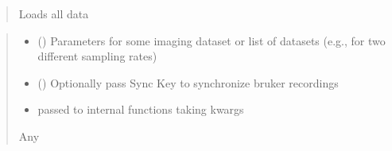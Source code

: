 \documentclass[letterpaper,10pt,english]{sphinxmanual}
\begin{document}
\begin{fulllineitems}
\begin{fulllineitems}
\begin{quote}
\sphinxAtStartPar
Loads all data
\end{quote}
\begin{quote}\begin{description}
\begin{itemize}
\item {} 
\sphinxAtStartPar
{} (\sphinxstyleliteralemphasis{\sphinxupquote{{[}}}\sphinxstyleliteralemphasis{\sphinxupquote{{]}}}) \textendash{} Parameters for some imaging dataset or list of datasets (e.g., for two different sampling rates)

\item {} 
\sphinxAtStartPar
{} (\sphinxstyleliteralemphasis{\sphinxupquote{{[}}}\sphinxstyleliteralemphasis{\sphinxupquote{, }}\sphinxstyleliteralemphasis{\sphinxupquote{{]}}}) \textendash{} Optionally pass Sync Key to synchronize bruker recordings

\item {} 
\sphinxAtStartPar
{} \textendash{} passed to internal functions taking kwargs

\end{itemize}

\sphinxAtStartPar
Any

\end{description}\end{quote}

\end{fulllineitems}


\end{fulllineitems}

\end{document}
